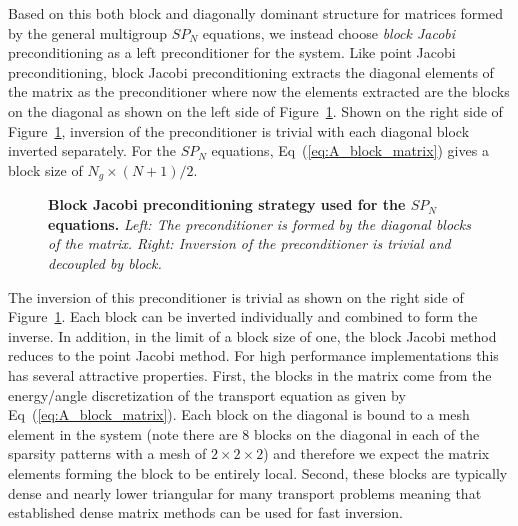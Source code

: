 Based on this both block and diagonally dominant structure for
matrices formed by the general multigroup $SP_N$ equations, we instead
choose \textit{block Jacobi} preconditioning as a left preconditioner
for the system. Like point Jacobi preconditioning, block Jacobi
preconditioning extracts the diagonal elements of the matrix as the
preconditioner where now the elements extracted are the blocks on the
diagonal as shown on the left side of
Figure~\ref{fig:block_jacobi_ex}. Shown on the right side of
Figure~\ref{fig:block_jacobi_ex}, inversion of the preconditioner is
trivial with each diagonal block inverted separately. For the $SP_N$
equations, Eq~(\ref{eq:A_block_matrix}) gives a block size of
$N_g\times(N+1)/2$.
\begin{figure}[t!]
  \begin{center}
    \scalebox{1.5}{
     }
  \end{center}
  \caption{\textbf{Block Jacobi preconditioning strategy used for the
      $SP_N$ equations.} \textit{Left: The preconditioner is formed by
      the diagonal blocks of the matrix. Right: Inversion of the
      preconditioner is trivial and decoupled by block.}}
  \label{fig:block_jacobi_ex}
\end{figure}
The inversion of this preconditioner is trivial as shown on the right
side of Figure~\ref{fig:block_jacobi_ex}. Each block can be inverted
individually and combined to form the inverse. In addition, in the
limit of a block size of one, the block Jacobi method reduces to the
point Jacobi method. For high performance implementations this has
several attractive properties. First, the blocks in the matrix come
from the energy/angle discretization of the transport equation as
given by Eq~(\ref{eq:A_block_matrix}). Each block on the diagonal is
bound to a mesh element in the system (note there are 8 blocks on the
diagonal in each of the sparsity patterns with a mesh of $2 \times 2
\times 2$) and therefore we expect the matrix elements forming the
block to be entirely local. Second, these blocks are typically dense
and nearly lower triangular for many transport problems meaning that
established dense matrix methods can be used for fast inversion.

